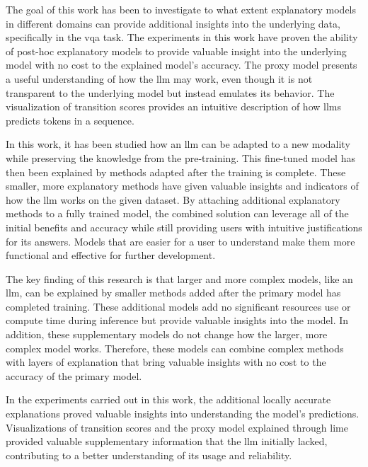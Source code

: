    The goal of this work has been to investigate to what extent explanatory models in different domains can provide additional insights into the underlying data, specifically in the \gls{vqa} task.
    The experiments in this work have proven the ability of post-hoc explanatory models to provide valuable insight into the underlying model with no cost to the explained model's accuracy. 
    The proxy model presents a useful understanding of how the \gls{llm} may work, even though it is not transparent to the underlying model but instead emulates its behavior. The visualization of transition scores provides an intuitive description of how \glspl{llm} predicts tokens in a sequence.  

    In this work, it has been studied how an \gls{llm} can be adapted to a new modality while preserving the knowledge from the pre-training.
    This fine-tuned model has then been explained by methods adapted after the training is complete. These smaller, more explanatory methods have given valuable insights and indicators of how the \gls{llm} works on the given dataset. 
    By attaching additional explanatory methods to a fully trained model, the combined solution can leverage all of the initial benefits and accuracy while still providing users with intuitive justifications for its answers. Models that are easier for a user to understand make them more functional and effective for further development.

   


    The key finding of this research is that larger and more complex models, like an \gls{llm}, can be explained by smaller methods added after the primary model has completed training. These additional models add no significant resources use or compute time during inference but provide valuable insights into the model. In addition, these supplementary models do not change how the larger, more complex model works. Therefore, these models can combine complex methods with layers of explanation that bring valuable insights with no cost to the accuracy of the primary model.

    



In the experiments carried out in this work, the additional locally accurate explanations proved valuable insights into understanding the model's predictions. Visualizations of transition scores and the proxy model explained through \gls{lime} provided valuable supplementary information that the \gls{llm} initially lacked, contributing to a better understanding of its usage and reliability.



